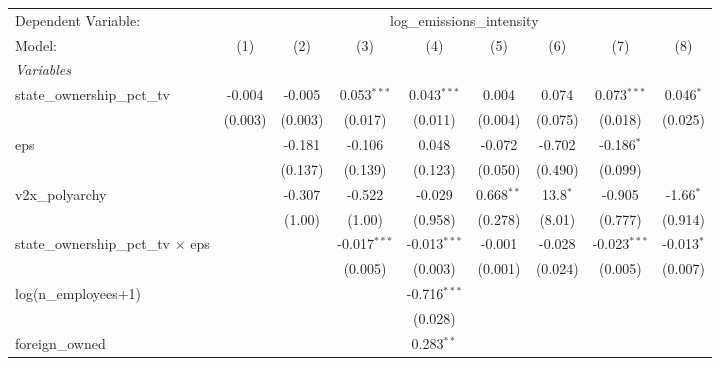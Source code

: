 
\begingroup
\centering
\begin{tabular}{lcccccccc}
   \tabularnewline \midrule \midrule
   Dependent Variable: & \multicolumn{8}{c}{log\_emissions\_intensity}\\
   Model:                                     & (1)     & (2)     & (3)            & (4)            & (5)          & (6)        & (7)            & (8)\\  
   \midrule
   \emph{Variables}\\
   state\_ownership\_pct\_tv                  & -0.004  & -0.005  & 0.053$^{***}$  & 0.043$^{***}$  & 0.004        & 0.074      & 0.073$^{***}$  & 0.046$^{*}$\\   
                                              & (0.003) & (0.003) & (0.017)        & (0.011)        & (0.004)      & (0.075)    & (0.018)        & (0.025)\\   
   eps                                        &         & -0.181  & -0.106         & 0.048          & -0.072       & -0.702     & -0.186$^{*}$   &   \\   
                                              &         & (0.137) & (0.139)        & (0.123)        & (0.050)      & (0.490)    & (0.099)        &   \\   
   v2x\_polyarchy                             &         & -0.307  & -0.522         & -0.029         & 0.668$^{**}$ & 13.8$^{*}$ & -0.905         & -1.66$^{*}$\\   
                                              &         & (1.00)  & (1.00)         & (0.958)        & (0.278)      & (8.01)     & (0.777)        & (0.914)\\   
   state\_ownership\_pct\_tv $\times$ eps     &         &         & -0.017$^{***}$ & -0.013$^{***}$ & -0.001       & -0.028     & -0.023$^{***}$ & -0.013$^{*}$\\   
                                              &         &         & (0.005)        & (0.003)        & (0.001)      & (0.024)    & (0.005)        & (0.007)\\   
   log(n\_employees+1)                        &         &         &                & -0.716$^{***}$ &              &            &                &   \\   
                                              &         &         &                & (0.028)        &              &            &                &   \\   
   foreign\_owned                             &         &         &                & 0.283$^{**}$   &              &            &                &   \\   

\end{tabular}
